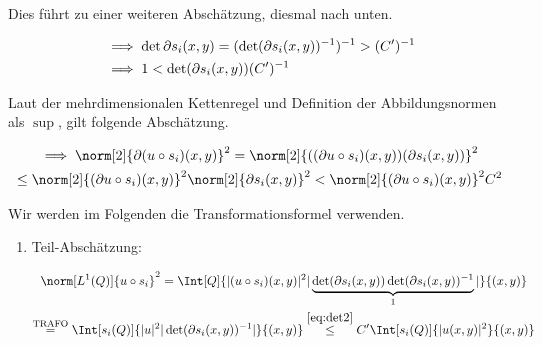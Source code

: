 \begin{solution}
\begin{enumerate}[label = \textbf{\alph*)}]
\begin{enumerate}[label = \arabic*.]
    Dies führt zu einer weiteren Abschätzung, diesmal nach unten.

    \begin{align}
      &
      \notag
      \implies
      \det \partial s_i(x, y)
      =
      (\det (\partial s_i(x, y))^{-1})^{-1}
      >
      (C^\prime)^{-1} \\
      &
      \label{eq:det3}
      \implies
      1
      <
      \det (\partial s_i(x, y))
      (C^\prime)^{-1}
    \end{align}

    Laut der mehrdimensionalen Kettenregel und Definition der Abbildungsnormen als $\sup$, gilt folgende Abschätzung.

    \begin{multline}
      \label{eq:Kettenregel-Ungleichung}
      \implies
      \norm[2]{\partial (u \circ s_i)(x, y)}^2
      =
      \norm[2]
      {
        (
          (\partial u \circ s_i)(x, y)
        )(
          \partial s_i(x, y)
        )}^2 \\
      \leq
      \norm[2]{(\partial u \circ s_i)(x, y)}^2
      \norm[2]{\partial s_i(x, y)}^2
      <
      \norm[2]{(\partial u \circ s_i)(x, y)}^2
      C^2
    \end{multline}

    Wir werden im Folgenden die Transformationsformel verwenden.


    \begin{enumerate}[label = \arabic*.]

      \item Teil-Abschätzung:

      \begin{multline}
        \label{eq:part1}
        \norm[L^1(Q)]{u \circ s_i}^2
        =
        \Int[Q]
        {
          |(u \circ s_i)(x, y)|^2
          |
            \underbrace
            {
              \det (\partial s_i(x, y))
              \det (\partial s_i(x, y))^{-1}
            }_1
          |
        }{(x, y)} \\
        \stackrel
        {
          \text{TRAFO}
        }{=}
        \Int[s_i(Q)]
        {
          |u|^2
          |\det (\partial s_i(x, y))^{-1}|
        }{(x, y)}
        \stackrel{\eqref{eq:det2}}{\leq}
        C^\prime
        \Int[s_i(Q)]{|u(x, y)|^2}{(x, y)}
      \end{multline}


\end{enumerate}
\end{enumerate}
\end{enumerate}
\end{solution}
